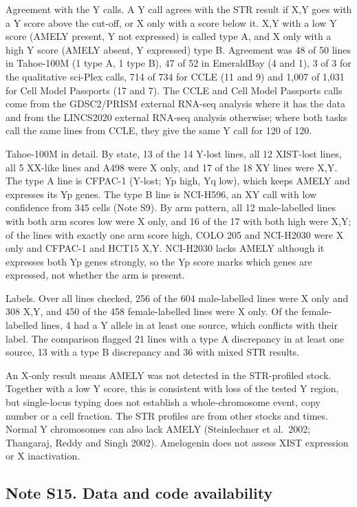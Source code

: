 \documentclass[
  11pt,
  letterpaper,
]{article}
\begin{document}
Agreement with the Y calls. A Y call agrees with the STR result if X,Y
goes with a Y score above the cut-off, or X only with a score below it.
X,Y with a low Y score (AMELY present, Y not expressed) is called type
A, and X only with a high Y score (AMELY absent, Y expressed) type B.
Agreement was 48 of 50 lines in Tahoe-100M (1 type A, 1 type B), 47 of
52 in EmeraldBay (4 and 1), 3 of 3 for the qualitative sci-Plex calls,
714 of 734 for CCLE (11 and 9) and 1,007 of 1,031 for Cell Model
Passports (17 and 7). The CCLE and Cell Model Passports calls come from
the GDSC2/PRISM external RNA-seq analysis where it has the data and from
the LINCS2020 external RNA-seq analysis otherwise; where both tasks call
the same lines from CCLE, they give the same Y call for 120 of 120.

Tahoe-100M in detail. By state, 13 of the 14 Y-lost lines, all 12
XIST-lost lines, all 5 XX-like lines and A498 were X only, and 17 of the
18 XY lines were X,Y. The type A line is CFPAC-1 (Y-lost; Yp high, Yq
low), which keeps AMELY and expresses its Yp genes. The type B line is
NCI-H596, an XY call with low confidence from 345 cells (Note S9). By
arm pattern, all 12 male-labelled lines with both arm scores low were X
only, and 16 of the 17 with both high were X,Y; of the lines with
exactly one arm score high, COLO 205 and NCI-H2030 were X only and
CFPAC-1 and HCT15 X,Y. NCI-H2030 lacks AMELY although it expresses both
Yp genes strongly, so the Yp score marks which genes are expressed, not
whether the arm is present.

Labels. Over all lines checked, 256 of the 604 male-labelled lines were
X only and 308 X,Y, and 450 of the 458 female-labelled lines were X
only. Of the female-labelled lines, 4 had a Y allele in at least one
source, which conflicts with their label. The comparison flagged 21
lines with a type A discrepancy in at least one source, 13 with a type B
discrepancy and 36 with mixed STR results.

An X-only result means AMELY was not detected in the STR-profiled stock.
Together with a low Y score, this is consistent with loss of the tested
Y region, but single-locus typing does not establish a whole-chromosome
event, copy number or a cell fraction. The STR profiles are from other
stocks and times. Normal Y chromosomes can also lack AMELY (Steinlechner
et al.~2002; Thangaraj, Reddy and Singh 2002). Amelogenin does not
assess XIST expression or X inactivation.

\subsection{Note S15. Data and code
availability}\label{note-s15.-data-and-code-availability}
\end{document}
